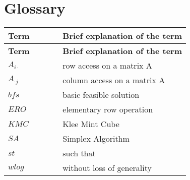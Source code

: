 \documentclass[main]{subfiles}
\begin{document}
\section{Glossary}
\renewcommand{\arraystretch}{1.5}


\begin{longtable}{p{0.3\linewidth} p{0.7\linewidth}}
\hline \textbf{Term} & \textbf{Brief explanation of the term}\\ \hline
\endfirsthead

\hline \textbf{Term} & \textbf{Brief explanation of the term}\\ \hline\hline
\endhead
$A_{i\cdot}$ & row access on a matrix A\\
$A_{\cdot j}$ & column access on a matrix A\\
$bfs$ & basic feasible solution\\
$ERO$ & elementary row operation\\
$KMC$ & Klee Mint Cube\\
$SA$ & Simplex Algorithm\\
$st$ & such that\\
$wlog$ & without loss of generality\\

\end{longtable}
\end{document}
